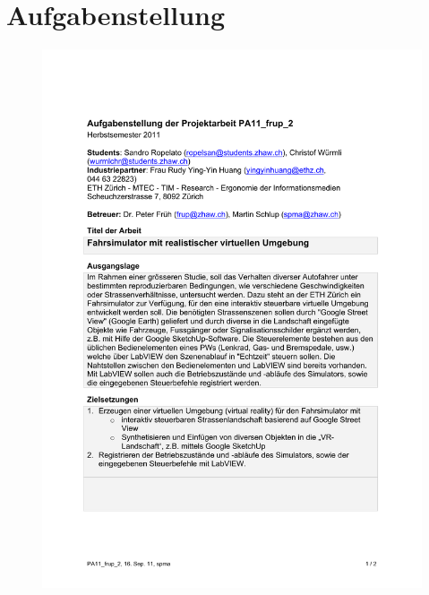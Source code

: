 \section{Aufgabenstellung}
\begin{figure}[H]
	\flushleft
	\includegraphics[width=\linewidth]{src/aufgabenstellung_seite1.pdf}
\end{figure}
\newpage
